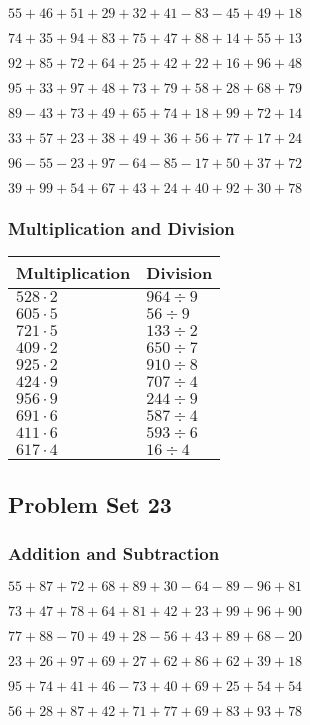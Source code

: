 \(55+46+51+29+32+41-83-45+49+18\)

\(74+35+94+83+75+47+88+14+55+13\)

\(92+85+72+64+25+42+22+16+96+48\)

\(95+33+97+48+73+79+58+28+68+79\)

\(89-43+73+49+65+74+18+99+72+14\)

\(33+57+23+38+49+36+56+77+17+24\)

\(96-55-23+97-64-85-17+50+37+72\)

\(39+99+54+67+43+24+40+92+30+78\)

\hypertarget{multiplication-and-division-21}{%
\subsubsection{Multiplication and
Division}\label{multiplication-and-division-21}}

\begin{longtable}[]{@{}ll@{}}
\toprule
Multiplication & Division\tabularnewline
\midrule
\endhead
\(528\cdot2\) & \(964÷9\)\tabularnewline
\(605\cdot5\) & \(56÷9\)\tabularnewline
\(721\cdot5\) & \(133÷2\)\tabularnewline
\(409\cdot2\) & \(650÷7\)\tabularnewline
\(925\cdot2\) & \(910÷8\)\tabularnewline
\(424\cdot9\) & \(707÷4\)\tabularnewline
\(956\cdot9\) & \(244÷9\)\tabularnewline
\(691\cdot6\) & \(587÷4\)\tabularnewline
\(411\cdot6\) & \(593÷6\)\tabularnewline
\(617\cdot4\) & \(16÷4\)\tabularnewline
\bottomrule
\end{longtable}

\hypertarget{problem-set-23}{%
\subsection{Problem Set 23}\label{problem-set-23}}

\hypertarget{addition-and-subtraction-22}{%
\subsubsection{Addition and
Subtraction}\label{addition-and-subtraction-22}}

\(55+87+72+68+89+30-64-89-96+81\)

\(73+47+78+64+81+42+23+99+96+90\)

\(77+88-70+49+28-56+43+89+68-20\)

\(23+26+97+69+27+62+86+62+39+18\)

\(95+74+41+46-73+40+69+25+54+54\)

\(56+28+87+42+71+77+69+83+93+78\)

